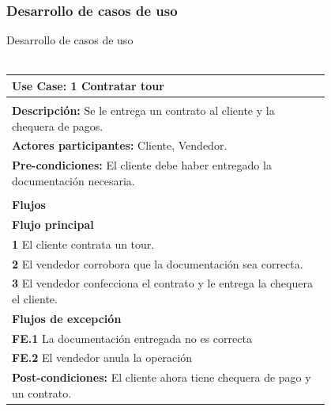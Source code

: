 \documentclass[12pt,a4paper,titlepage,oneside]{article}
\begin{document}
\subsubsection{Desarrollo de casos de uso}

Desarrollo de casos de uso
\\\

\begin{tabular}{| l | p{0.8\linewidth} |} \hline
	\multicolumn{2}{|p{0.8\linewidth}|}{\textbf{Use Case:} 1 Contratar tour} \\ \hline
	\multicolumn{2}{|c|}{} \\ \hline
	\multicolumn{2}{|p{0.8\linewidth}|}{\textbf{Descripci\'on:} Se le entrega un contrato al cliente y  la chequera de pagos.} \\ \hline
	\multicolumn{2}{|p{0.8\linewidth}|}{\textbf{Actores participantes:} Cliente, Vendedor.} \\ \hline
	\multicolumn{2}{|p{0.8\linewidth}|}{\textbf{Pre-condiciones:} El cliente debe haber entregado la documentación necesaria.} \\ \hline
	\multicolumn{2}{|c|}{} \\ \hline
	\multicolumn{2}{|p{0.8\linewidth}|}{\textbf{Flujos}} \\ \hline
	\multicolumn{2}{|p{0.8\linewidth}|}{\textbf{Flujo principal}} \\ \hline
	\multicolumn{2}{|p{0.8\linewidth}|}{\textbf{1} El cliente contrata un tour.} \\ \hline
	\multicolumn{2}{|p{0.8\linewidth}|}{\textbf{2} El vendedor corrobora que la documentación sea correcta.} \\ \hline
	\multicolumn{2}{|p{0.8\linewidth}|}{\textbf{3} El vendedor confecciona el contrato y le entrega la chequera el 	cliente.} \\ \hline
	\multicolumn{2}{|p{0.8\linewidth}|}{\textbf{Flujos de excepci\'on}} \\ \hline
	\multicolumn{2}{|p{0.8\linewidth}|}{\textbf{FE.1} La documentación entregada no es correcta} \\ \hline
	\multicolumn{2}{|p{0.8\linewidth}|}{\textbf{FE.2} El vendedor anula la operación} \\ \hline
	\multicolumn{2}{|p{0.8\linewidth}|}{\textbf{Post-condiciones:} El cliente ahora tiene chequera de pago y un contrato.}\\ \hline
\end{tabular} \\\\
 \\\\
\end{document}
